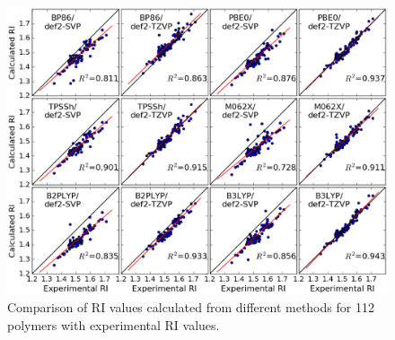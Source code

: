 \begin{figure}[htbp] 
	\centering
	\includegraphics[width=1.0\textwidth]{Chapter-3/Figures/RI_all_methods.eps}
	\caption{Comparison of RI values calculated from different methods for 112 polymers with experimental RI values.} 
	\label{fig:RI_all_methods} 
\end{figure}  

